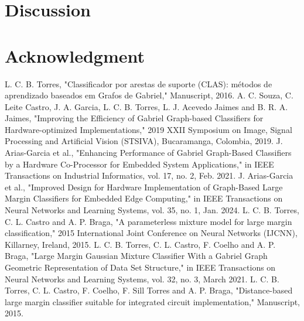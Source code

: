 \documentclass[conference]{IEEEtran}
\begin{document}








\section{Discussion}

\section*{Acknowledgment}

\begin{thebibliography}{00}
     L. C. B. Torres, "Classificador por arestas de suporte (CLAS): métodos de aprendizado baseados em Grafos de Gabriel," Manuscript, 2016.
     A. C. Souza, C. Leite Castro, J. A. Garcia, L. C. B. Torres, L. J. Acevedo Jaimes and B. R. A. Jaimes, "Improving the Efficiency of Gabriel Graph-based Classifiers for Hardware-optimized Implementations," 2019 XXII Symposium on Image, Signal Processing and Artificial Vision (STSIVA), Bucaramanga, Colombia, 2019.
     J. Arias-Garcia et al., "Enhancing Performance of Gabriel Graph-Based Classifiers by a Hardware Co-Processor for Embedded System Applications," in IEEE Transactions on Industrial Informatics, vol. 17, no. 2, Feb. 2021.
     J. Arias-Garcia et al., "Improved Design for Hardware Implementation of Graph-Based Large Margin Classifiers for Embedded Edge Computing," in IEEE Transactions on Neural Networks and Learning Systems, vol. 35, no. 1, Jan. 2024.
     L. C. B. Torres, C. L. Castro and A. P. Braga, "A parameterless mixture model for large margin classification," 2015 International Joint Conference on Neural Networks (IJCNN), Killarney, Ireland, 2015.
     L. C. B. Torres, C. L. Castro, F. Coelho and A. P. Braga, "Large Margin Gaussian Mixture Classifier With a Gabriel Graph Geometric Representation of Data Set Structure," in IEEE Transactions on Neural Networks and Learning Systems, vol. 32, no. 3, March 2021.
     L. C. B. Torres, C. L. Castro, F. Coelho, F. Sill Torres and A. P. Braga, "Distance-based large margin classifier suitable for integrated circuit implementation," Manuscript, 2015.
\end{thebibliography}
\end{document}
